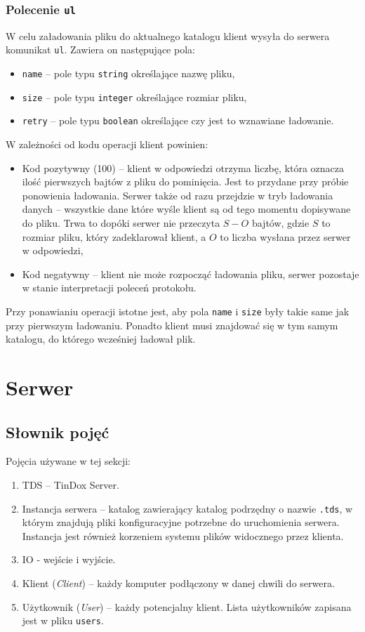 \documentclass[8pt,a4paper]{article}
\begin{document}
\subsubsection{Polecenie \texttt{ul}}
W celu załadowania pliku do aktualnego katalogu klient wysyła do serwera komunikat \texttt{ul}. Zawiera on następujące pola:
\begin{itemize}
    \item \texttt{name} -- pole typu \texttt{string} określające nazwę pliku,
    \item \texttt{size} -- pole typu \texttt{integer} określające rozmiar pliku,
    \item \texttt{retry} -- pole typu \texttt{boolean} określające czy jest to wznawiane ładowanie.
\end{itemize}
W zależności od kodu operacji klient powinien:
\begin{itemize}
    \item Kod pozytywny (100) -- klient w odpowiedzi otrzyma liczbę, która oznacza ilość pierwszych bajtów z pliku do pominięcia. Jest to przydane przy próbie ponowienia ładowania. Serwer także od razu przejdzie w tryb ładowania danych -- wszystkie dane które wyśle klient są od tego momentu dopisywane do pliku. Trwa to dopóki serwer nie przeczyta $S - O$ bajtów, gdzie $S$ to rozmiar pliku, który zadeklarował klient, a $O$ to liczba wysłana przez serwer w odpowiedzi,
    \item Kod negatywny -- klient nie może rozpocząć ładowania pliku, serwer pozostaje w stanie interpretacji poleceń protokołu.
\end{itemize}
Przy ponawianiu operacji istotne jest, aby pola \texttt{name} i \texttt{size} były takie same jak przy pierwszym ładowaniu. Ponadto klient musi znajdować się w tym samym katalogu, do którego wcześniej ładował plik.

\pagebreak
\section{Serwer}

\subsection{Słownik pojęć}
\noindent Pojęcia używane w tej sekcji:
\begin{enumerate}
    \item TDS -- TinDox Server.
    \item Instancja serwera -- katalog zawierający katalog podrzędny o nazwie \texttt{.tds}, w którym znajdują pliki konfiguracyjne potrzebne do uruchomienia serwera. Instancja jest również korzeniem systemu plików widocznego przez klienta.
    \item IO - wejście i wyjście.
    \item Klient (\textit{Client}) -- każdy komputer podłączony w danej chwili do serwera.
    \item Użytkownik (\textit{User}) -- każdy potencjalny klient. Lista użytkowników zapisana jest w pliku \texttt{users}.
\end{enumerate}
\end{document}
